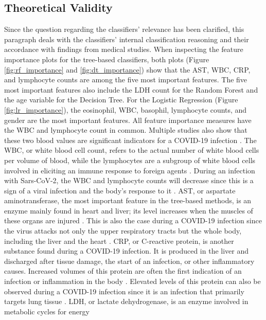 \subsection{Theoretical Validity}
\label{sec:medical}
Since the question regarding the classifiers' relevance has been 
clarified, this paragraph deals with the classifiers' internal classification 
reasoning and their accordance with findings from medical studies.
When inspecting the feature importance plots for the tree-based classifiers, 
both plots (Figure \ref{fig:rf_importance} and \ref{fig:dt_importance}) show 
that the AST, WBC, CRP, and lymphocyte counts are among the five most important 
features.
The five most important features also include the LDH count for the Random 
Forest 
and the age variable for the Decision Tree. For the Logistic Regression (Figure 
\ref{fig:lr_importance}), the eosinophil, WBC, basophil, lymphocyte counts, and 
gender are the most important features. All feature importance 
measures have the WBC and lymphocyte count in common. Multiple studies also show 
that these two blood values are significant indicators for a COVID-19 infection 
\cite{RN162, RN185, RN186}. 
The WBC, or white blood cell count, refers to the actual number of white blood 
cells per volume of blood, while the lymphocytes are a subgroup of white blood 
cells involved in eliciting an immune response to foreign agents \cite{RN137, 
RN188}. 
During an infection with Sars-CoV-2, the WBC and lymphocyte counts will 
decrease since this is a sign of a viral infection and the body's response to 
it \cite{RN162,RN186, RN185}.
AST, or aspartate aminotransferase, the most important feature in the 
tree-based methods, is an enzyme mainly found in heart and liver; its level 
increases when the muscles of these organs are injured \cite{RN189, RN188}. 
This is also the case during a COVID-19 infection since the virus attacks not 
only the upper respiratory tracts but the whole body, including the liver and 
the heart \cite{RN182}. CRP, or C-reactive protein, is another substance found 
during a COVID-19 infection. It is produced in the liver and discharged after 
tissue damage, the start of an infection, or other inflammatory causes. 
Increased volumes of this protein are often the first indication of an 
infection or inflammation in the body \cite{RN138, RN188}. Elevated levels of 
this protein can also be observed during a COVID-19 infection since it is an 
infection that primarily targets lung tissue \cite{RN187, RN162}. LDH, or 
lactate dehydrogenase, is an enzyme involved in metabolic cycles for energy 
